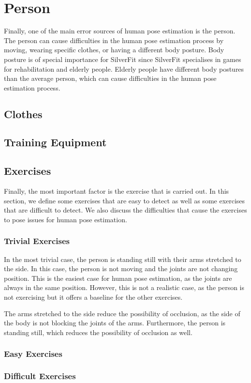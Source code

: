 \section{Person}

Finally, one of the main error sources of human pose estimation is the person. The person can cause difficulties in the human pose estimation process by moving, wearing specific clothes, or having a different body posture. Body posture is of special importance for SilverFit since SilverFit specialises in games for rehabilitation and elderly people. Elderly people have different body postures than the average person, which can cause difficulties in the human pose estimation process.

\subsection{Clothes}

\subsection{Training Equipment}

\subsection{Exercises}

Finally, the most important factor is the exercise that is carried out. In this section, we define some exercises that are easy to detect as well as some exercises that are difficult to detect. We also discuss the difficulties that cause the exercises to pose issues for human pose estimation.

\subsubsection{Trivial Exercises}

In the most trivial case, the person is standing still with their arms stretched to the side. In this case, the person is not moving and the joints are not changing position. This is the easiest case for human pose estimation, as the joints are always in the same position. However, this is not a realistic case, as the person is not exercising but it offers a baseline for the other exercises.

The arms stretched to the side reduce the possibility of occlusion, as the side of the body is not blocking the joints of the arms. Furthermore, the person is standing still, which reduces the possibility of occlusion as well.

\subsubsection{Easy Exercises}

\subsubsection{Difficult Exercises}